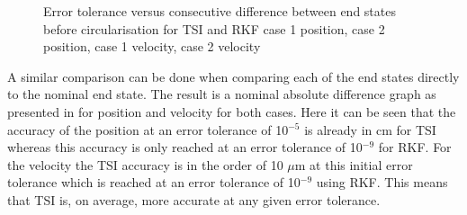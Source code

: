 \begin{figure}[H]
\caption{Error tolerance versus consecutive difference between end states before circularisation for \ac{TSI} and \ac{RKF} \protect{} case 1 position, \protect{} case 2 position, \protect{} case 1 velocity, \protect{} case 2 velocity } 
\label{fig:errorToleranceVsConsecutiveDifferenceCase1RKFTSIpositionSmall} 
\end{figure} 

\noindent
A similar comparison can be done when comparing each of the end states directly to the nominal end state. The result is a nominal absolute difference graph as presented in  for position and velocity for both cases. Here it can be seen that the accuracy of the position at an error tolerance of 10$^{-5}$ is already in cm for \ac{TSI} whereas this accuracy is only reached at an error tolerance of 10$^{-9}$ for \ac{RKF}. For the velocity the \ac{TSI} accuracy is in the order of 10 $\mu$m at this initial error tolerance which is reached at an error tolerance of 10$^{-9}$ using \ac{RKF}. This means that \ac{TSI} is, on average, more accurate at any given error tolerance.  

